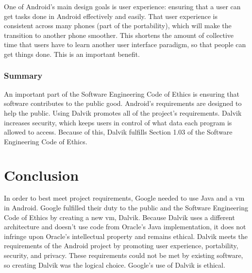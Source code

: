 \documentclass[11pt]{article}
\begin{document}
\begin{multicols}{2}
One of Android's main design goals is user experience: ensuring that a user can
get tasks done in Android effectively and easily.  That user experience is
consistent across many phones (part of the portability), which will make the
transition to another phone smoother.  This shortens the amount of collective
time that users have to learn another user interface paradigm, so that people
can get things done.  This is an important benefit.


\subsubsection{Summary} %
\label{ssub:public-summary}

An important part of the Software Engineering Code of Ethics is ensuring that
software contributes to the public good.  Android's requirements are designed to
help the public.  Using Dalvik promotes all of the project's requirements.
Dalvik increases security, which keeps users in control of what data each
program is allowed to access.  Because of this, Dalvik fulfills Section 1.03 of
the Software Engineering Code of Ethics.




\section{Conclusion} %
\label{sec:conclusion}

In order to best meet project requirements, Google needed to use Java and a
\gls{vm} in Android.  Google fulfilled their duty to the public and the Software
Engineering Code of Ethics by creating a new \gls{vm}, Dalvik.  Because Dalvik
uses a different architecture and doesn't use code from Oracle's Java
implementation, it does not infringe upon Oracle's intellectual property and
remains ethical.  Dalvik meets the requirements of the Android project by
promoting user experience, portability, security, and privacy.  These
requirements could not be met by existing software, so creating Dalvik was the
logical choice.  Google's use of Dalvik is ethical.


\appendix

\printglossaries

\end{multicols}
\newpage

\nocite{*}


\end{document}
